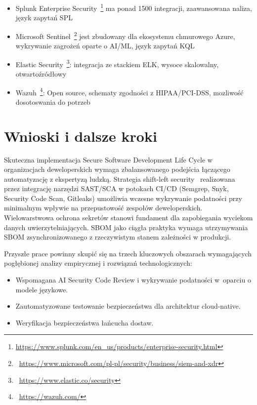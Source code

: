 \begin{itemize}
\item Splunk Enterprise Security~\footnote{\url{https://www.splunk.com/en_us/products/enterprise-security.html}} ma ponad 1500 integracji, zaawansowana naliza, język zapytań SPL
\item Microsoft Sentinel~\footnote{~\url{https://www.microsoft.com/pl-pl/security/business/siem-and-xdr}} jest zbudowany dla ekosystemu chmurowego Azure, wykrywanie zagrożeń oparte o AI/ML, język zapytań KQL
\item Elastic Security~\footnote{~\url{https://www.elastic.co/security}}: integracja ze stackiem ELK, wysoce skalowalny, otwartoźródłowy
\item Wazuh~\footnote{~\url{https://wazuh.com/}}: Open source, schematy zgodności z HIPAA/PCI-DSS, mozliwość dosotoswania do potrzeb
\end{itemize}

\section{Wnioski i dalsze kroki}

Skuteczna implementacja Secure Software Development Life Cycle w organizacjach deweloperskich wymaga zbalansowanego podejścia łączącego automatyzację z ekspertyzą ludzką. Strategia shift-left security~\cite{Malik2025} realizowana przez integrację narzędzi SAST/SCA w potokach CI/CD (Semgrep, Snyk, Security Code Scan, Gitleaks) umożliwia wczesne wykrywanie podatności przy minimalnym wpływie na przepustowość zespołów deweloperskich. Wielowarstwowa ochrona sekretów stanowi fundament dla zapobiegania wyciekom danych uwierzytelniających. SBOM jako ciągła praktyka wymaga utrzymywania SBOM zsynchronizowanego z rzeczywistym stanem zależności w produkcji. 

Przyszłe prace powinny skupić się na trzech kluczowych obszarach wymagających pogłębionej analizy empirycznej i rozwiązań technologicznych:

\begin{itemize}
\item Wspomagana AI Security Code Review i wykrywanie podatności w~oparciu o modele językowe.
\item Zautomatyzowane testowanie bezpieczeństwa dla architektur cloud-native.
\item Weryfikacja bezpieczeństwa łańcucha dostaw.
\end{itemize}

